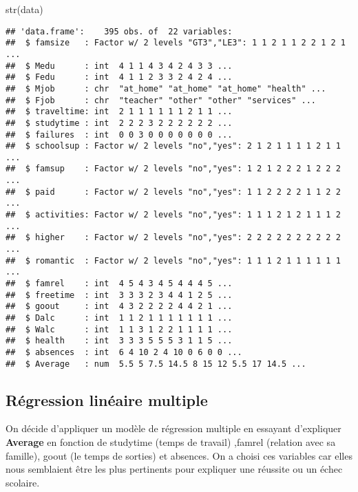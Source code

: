 \documentclass[
]{article}
\newenvironment{Shaded}{\begin{snugshade}}{\end{snugshade}}
\newcommand{\FunctionTok}[1]{\textcolor[rgb]{0.00,0.00,0.00}{#1}}
\newcommand{\NormalTok}[1]{#1}
\begin{document}
\begin{Shaded}
\begin{Highlighting}[]
\FunctionTok{str}\NormalTok{(data)}
\end{Highlighting}
\end{Shaded}

\begin{verbatim}
## 'data.frame':    395 obs. of  22 variables:
##  $ famsize   : Factor w/ 2 levels "GT3","LE3": 1 1 2 1 1 2 2 1 2 1 ...
##  $ Medu      : int  4 1 1 4 3 4 2 4 3 3 ...
##  $ Fedu      : int  4 1 1 2 3 3 2 4 2 4 ...
##  $ Mjob      : chr  "at_home" "at_home" "at_home" "health" ...
##  $ Fjob      : chr  "teacher" "other" "other" "services" ...
##  $ traveltime: int  2 1 1 1 1 1 1 2 1 1 ...
##  $ studytime : int  2 2 2 3 2 2 2 2 2 2 ...
##  $ failures  : int  0 0 3 0 0 0 0 0 0 0 ...
##  $ schoolsup : Factor w/ 2 levels "no","yes": 2 1 2 1 1 1 1 2 1 1 ...
##  $ famsup    : Factor w/ 2 levels "no","yes": 1 2 1 2 2 2 1 2 2 2 ...
##  $ paid      : Factor w/ 2 levels "no","yes": 1 1 2 2 2 2 1 1 2 2 ...
##  $ activities: Factor w/ 2 levels "no","yes": 1 1 1 2 1 2 1 1 1 2 ...
##  $ higher    : Factor w/ 2 levels "no","yes": 2 2 2 2 2 2 2 2 2 2 ...
##  $ romantic  : Factor w/ 2 levels "no","yes": 1 1 1 2 1 1 1 1 1 1 ...
##  $ famrel    : int  4 5 4 3 4 5 4 4 4 5 ...
##  $ freetime  : int  3 3 3 2 3 4 4 1 2 5 ...
##  $ goout     : int  4 3 2 2 2 2 4 4 2 1 ...
##  $ Dalc      : int  1 1 2 1 1 1 1 1 1 1 ...
##  $ Walc      : int  1 1 3 1 2 2 1 1 1 1 ...
##  $ health    : int  3 3 3 5 5 5 3 1 1 5 ...
##  $ absences  : int  6 4 10 2 4 10 0 6 0 0 ...
##  $ Average   : num  5.5 5 7.5 14.5 8 15 12 5.5 17 14.5 ...
\end{verbatim}

\hypertarget{ruxe9gression-linuxe9aire-multiple}{%
\subsection{Régression linéaire
multiple}\label{ruxe9gression-linuxe9aire-multiple}}

On décide d'appliquer un modèle de régression multiple en essayant
d'expliquer \textbf{Average} en fonction de studytime (temps de travail)
,famrel (relation avec sa famille), goout (le temps de sorties) et
absences. On a choisi ces variables car elles nous semblaient être les
plus pertinents pour expliquer une réussite ou un échec scolaire.
\end{document}
